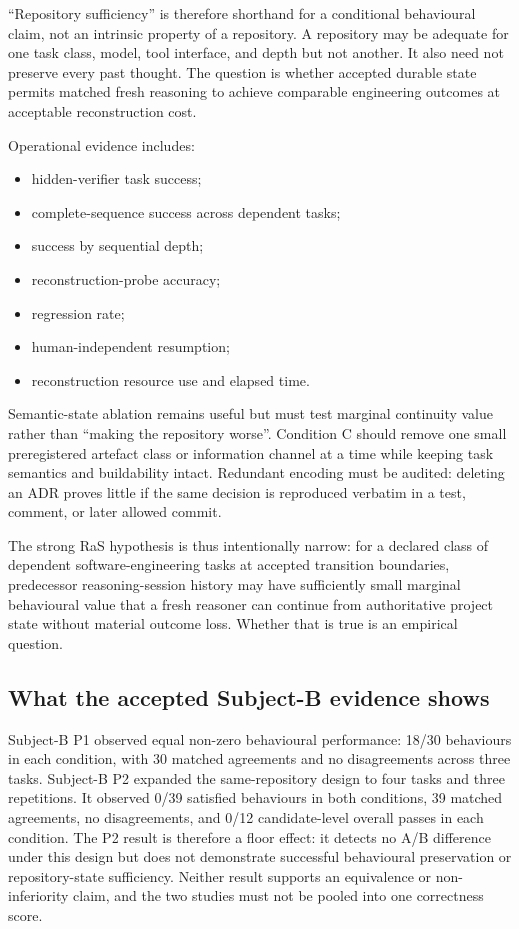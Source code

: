 “Repository sufficiency” is therefore shorthand for a conditional behavioural claim, not an intrinsic property of a repository. A repository may be adequate for one task class, model, tool interface, and depth but not another. It also need not preserve every past thought. The question is whether accepted durable state permits matched fresh reasoning to achieve comparable engineering outcomes at acceptable reconstruction cost.

Operational evidence includes:
\begin{itemize}
    \item hidden-verifier task success;
    \item complete-sequence success across dependent tasks;
    \item success by sequential depth;
    \item reconstruction-probe accuracy;
    \item regression rate;
    \item human-independent resumption;
    \item reconstruction resource use and elapsed time.
\end{itemize}

Semantic-state ablation remains useful but must test marginal continuity value rather than “making the repository worse”. Condition C should remove one small preregistered artefact class or information channel at a time while keeping task semantics and buildability intact. Redundant encoding must be audited: deleting an ADR proves little if the same decision is reproduced verbatim in a test, comment, or later allowed commit.

The strong RaS hypothesis is thus intentionally narrow: for a declared class of dependent software-engineering tasks at accepted transition boundaries, predecessor reasoning-session history may have sufficiently small marginal behavioural value that a fresh reasoner can continue from authoritative project state without material outcome loss. Whether that is true is an empirical question.

\subsection{What the accepted Subject-B evidence shows}

Subject-B P1 observed equal non-zero behavioural performance: 18/30 behaviours in each condition, with 30 matched agreements and no disagreements across three tasks. Subject-B P2 expanded the same-repository design to four tasks and three repetitions. It observed 0/39 satisfied behaviours in both conditions, 39 matched agreements, no disagreements, and 0/12 candidate-level overall passes in each condition. The P2 result is therefore a floor effect: it detects no A/B difference under this design but does not demonstrate successful behavioural preservation or repository-state sufficiency. Neither result supports an equivalence or non-inferiority claim, and the two studies must not be pooled into one correctness score.
